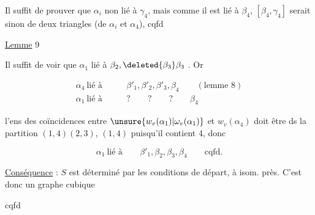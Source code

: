 
Il suffit de prouver que $\alpha_i$ non lié à $\gamma_4$, mais comme il est lié à $\beta_4$, $[\beta_4,\gamma_4]$ serait sinon  de deux triangles (de  $\alpha_i$ et $\alpha_4$), cqfd


\uline{Lemme} 9



Il suffit de voir que $\alpha_1$ lié à $\beta_2,\deleted{\beta_3}\beta_3$ . Or

\[
\begin{aligned}
\alpha_4\ \text{lié à}&\qquad\beta'_1,\beta'_2,\beta'_3,\beta_4\qquad(\text{lemme }8)\\
\alpha_1\ \text{lié à}&\qquad ?\qquad ?\qquad ?\qquad\beta_4
\end{aligned}
\]

 l'ens des coïncidences entre $\unsure{w_v(\alpha_1)|\omega_v(\alpha_1)}$ et $w_v(\alpha_4)$ doit être ds la partition $(1,4)(2,3)$,   $(1,4)$ puisqu'il contient 4, donc

\[
\alpha_1\ \text{lié à}\qquad\beta'_1,\beta_2,\beta_3,\beta_4\qquad\text{cqfd.}
\]

\uline{Conséquence} : $S$ est déterminé par les conditions de départ, à isom. près.  C'est donc un graphe cubique

\begin{center}cqfd\end{center}

